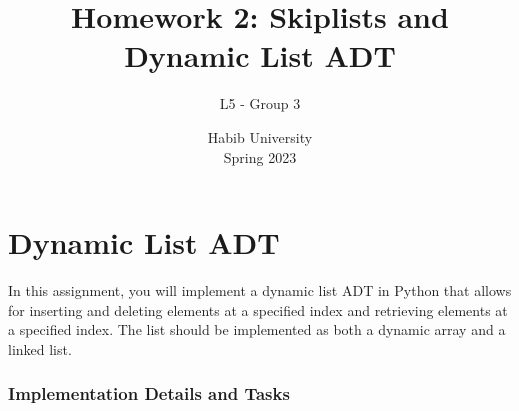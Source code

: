 \documentclass[addpoints]{exam}
\title{Homework 2: Skiplists and Dynamic List ADT}
\author{L5 - Group 3}  %
\date{Habib University\\Spring 2023}
\begin{document}
\maketitle
\part{Dynamic List ADT}

In this assignment, you will implement a dynamic list ADT in Python that allows for inserting and deleting elements at a specified index and retrieving elements at a specified index.
The list should be implemented as both a dynamic array and a linked list.


\section{Implementation Details and Tasks}
\end{document}
